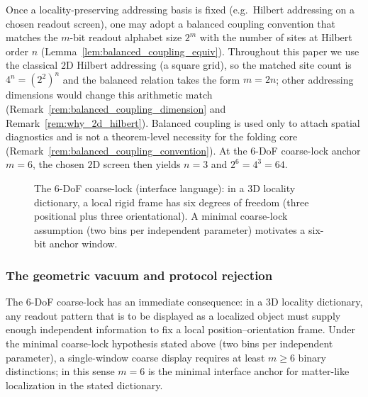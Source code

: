 Once a locality-preserving addressing basis is fixed (e.g.\ Hilbert addressing on a chosen readout screen), one may adopt a balanced coupling convention that matches the $m$-bit readout alphabet size $2^m$ with the number of sites at Hilbert order $n$ (Lemma~\ref{lem:balanced_coupling_equiv}).
Throughout this paper we use the classical $2$D Hilbert addressing (a square grid), so the matched site count is $4^n=(2^2)^n$ and the balanced relation takes the form $m=2n$; other addressing dimensions would change this arithmetic match (Remark~\ref{rem:balanced_coupling_dimension} and Remark~\ref{rem:why_2d_hilbert}).
Balanced coupling is used only to attach spatial diagnostics and is not a theorem-level necessity for the folding core (Remark~\ref{rem:balanced_coupling_convention}).
At the 6-DoF coarse-lock anchor $m=6$, the chosen $2$D screen then yields $n=3$ and $2^6=4^3=64$.

\begin{figure}[t]
\centering
{}
\caption{The 6-DoF coarse-lock (interface language): in a $3$D locality dictionary, a local rigid frame has six degrees of freedom (three positional plus three orientational). A minimal coarse-lock assumption (two bins per independent parameter) motivates a six-bit anchor window.}
\label{fig:6dof_lock}
\end{figure}

\subsubsection{The geometric vacuum and protocol rejection}
\label{subsubsec:geometric_vacuum}
The 6-DoF coarse-lock has an immediate consequence: in a $3$D locality dictionary, any readout pattern that is to be displayed as a localized object must supply enough independent information to fix a local position--orientation frame.
Under the minimal coarse-lock hypothesis stated above (two bins per independent parameter), a single-window coarse display requires at least $m\ge 6$ binary distinctions; in this sense $m=6$ is the minimal interface anchor for matter-like localization in the stated dictionary.

